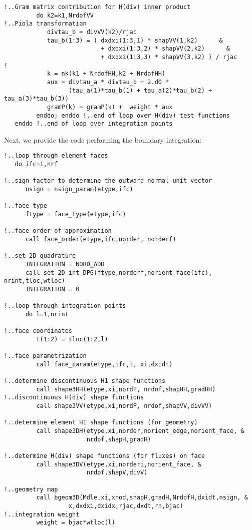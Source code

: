 \begin{lstlisting}[mathescape,caption=\file{POISSON/ULTRAWEAK\_DPG/}\routine{elem}: element integration]
!..Gram matrix contribution for H(div) inner product
         do k2=k1,NrdofVV
!..Piola transformation
            divtau_b = divVV(k2)/rjac
            tau_b(1:3) = ( dxdxi(1:3,1) * shapVV(1,k2)      &
                           + dxdxi(1:3,2) * shapVV(2,k2)      &
                           + dxdxi(1:3,3) * shapVV(3,k2) ) / rjac
!
            k = nk(k1 + NrdofHH,k2 + NrdofHH)
            aux = divtau_a * divtau_b + 2.d0 * 
                  (tau_a(1)*tau_b(1) + tau_a(2)*tau_b(2) + tau_a(3)*tau_b(3))
            gramP(k) = gramP(k) +  weight * aux
         enddo; enddo !..end of loop over H(div) test functions
   enddo !..end of loop over integration points
\end{lstlisting}

Next, we provide the code performing the boundary integration:
\begin{lstlisting}[mathescape,caption=\file{POISSON/ULTRAWEAK\_DPG/}\routine{elem}: boundary integration]
!..loop through element faces
   do ifc=1,nrf

!..sign factor to determine the outward normal unit vector
      nsign = nsign_param(etype,ifc)

!..face type
      ftype = face_type(etype,ifc)

!..face order of approximation
      call face_order(etype,ifc,norder, norderf)

!..set 2D quadrature
      INTEGRATION = NORD_ADD
      call set_2D_int_DPG(ftype,norderf,norient_face(ifc), nrint,tloc,wtloc)
      INTEGRATION = 0

!..loop through integration points
      do l=1,nrint

!..face coordinates
         t(1:2) = tloc(1:2,l)

!..face parametrization
         call face_param(etype,ifc,t, xi,dxidt)

!..determine discontinuous H1 shape functions
         call shape3HH(etype,xi,nordP, nrdof,shapHH,gradHH)
!..discontinuous H(div) shape functions
         call shape3VV(etype,xi,nordP, nrdof,shapVV,divVV)

!..determine element H1 shape functions (for geometry)
         call shape3DH(etype,xi,norder,norient_edge,norient_face, &
                       nrdof,shapH,gradH)

!..determine H(div) shape functions (for fluxes) on face
         call shape3DV(etype,xi,norderi,norient_face, &
                       nrdof,shapV,divV)

!..geometry map
         call bgeom3D(Mdle,xi,xnod,shapH,gradH,NrdofH,dxidt,nsign, &
                  x,dxdxi,dxidx,rjac,dxdt,rn,bjac)
!..integration weight
         weight = bjac*wtloc(l)


\end{lstlisting}
